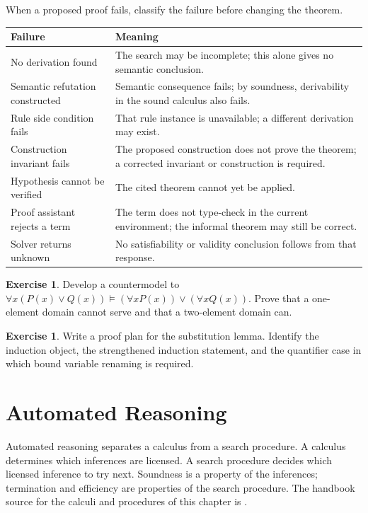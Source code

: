 \documentclass[11pt,oneside,openany]{book}
\theoremstyle{definition}
\newtheorem{exercise}[definition]{Exercise}
\theoremstyle{plain}
\theoremstyle{remark}
\newcommand{\entails}{\models}
\begin{document}
When a proposed proof fails, classify the failure before changing the theorem.
\begin{longtable}{@{}p{}p{}@{}}
\toprule
Failure & Meaning \\
\midrule
\endhead
No derivation found & The search may be incomplete; this alone gives no
semantic conclusion. \\
Semantic refutation constructed & Semantic consequence fails; by soundness,
derivability in the sound calculus also fails. \\
Rule side condition fails & That rule instance is unavailable; a different
derivation may exist. \\
Construction invariant fails & The proposed construction does not prove the
theorem; a corrected invariant or construction is required. \\
Hypothesis cannot be verified & The cited theorem cannot yet be applied. \\
Proof assistant rejects a term & The term does not type-check in the current
environment; the informal theorem may still be correct. \\
Solver returns unknown & No satisfiability or validity conclusion follows from
that response. \\
\bottomrule
\end{longtable}

\begin{exercise}
\label{ex:formal-practice-01}
Develop a countermodel to
\(\forall x(P(x)\lor Q(x))\entails
(\forall xP(x))\lor(\forall xQ(x))\).  Prove that a one-element domain cannot
serve and that a two-element domain can.
\end{exercise}

\begin{exercise}
\label{ex:formal-practice-02}
Write a proof plan for the substitution lemma.  Identify the induction object,
the strengthened induction statement, and the quantifier case in which bound
variable renaming is required.
\end{exercise}

\chapter{Automated Reasoning}
\label{ch:automated-reasoning}

Automated reasoning separates a calculus from a search procedure.  A calculus
determines which inferences are licensed.  A search procedure decides which
licensed inference to try next.  Soundness is a property of the inferences;
termination and efficiency are properties of the search procedure.  The
handbook source for the calculi and procedures of this chapter is
\cite{RobinsonVoronkov2001}.
\end{document}
